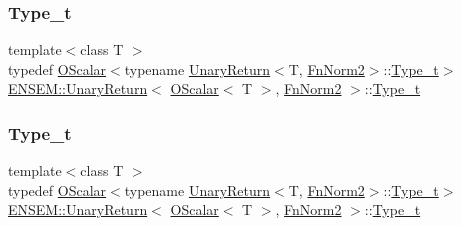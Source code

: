 \subsubsection{\texorpdfstring{Type\_t}{Type\_t}\hspace{0.1cm}{\footnotesize\ttfamily [1/3]}}
{\footnotesize\ttfamily template$<$class T $>$ \\
typedef \mbox{\hyperlink{classENSEM_1_1OScalar}{O\+Scalar}}$<$typename \mbox{\hyperlink{structENSEM_1_1UnaryReturn}{Unary\+Return}}$<$T, \mbox{\hyperlink{structENSEM_1_1FnNorm2}{Fn\+Norm2}}$>$\+::\mbox{\hyperlink{structENSEM_1_1UnaryReturn_3_01OScalar_3_01T_01_4_00_01FnNorm2_01_4_ac5e99e6905d2033009638fb21f07f1be}{Type\+\_\+t}}$>$ \mbox{\hyperlink{structENSEM_1_1UnaryReturn}{E\+N\+S\+E\+M\+::\+Unary\+Return}}$<$ \mbox{\hyperlink{classENSEM_1_1OScalar}{O\+Scalar}}$<$ T $>$, \mbox{\hyperlink{structENSEM_1_1FnNorm2}{Fn\+Norm2}} $>$\+::\mbox{\hyperlink{structENSEM_1_1UnaryReturn_3_01OScalar_3_01T_01_4_00_01FnNorm2_01_4_ac5e99e6905d2033009638fb21f07f1be}{Type\+\_\+t}}}

\mbox{\label{structENSEM_1_1UnaryReturn_3_01OScalar_3_01T_01_4_00_01FnNorm2_01_4_ac5e99e6905d2033009638fb21f07f1be}} 
\subsubsection{\texorpdfstring{Type\_t}{Type\_t}\hspace{0.1cm}{\footnotesize\ttfamily [2/3]}}
{\footnotesize\ttfamily template$<$class T $>$ \\
typedef \mbox{\hyperlink{classENSEM_1_1OScalar}{O\+Scalar}}$<$typename \mbox{\hyperlink{structENSEM_1_1UnaryReturn}{Unary\+Return}}$<$T, \mbox{\hyperlink{structENSEM_1_1FnNorm2}{Fn\+Norm2}}$>$\+::\mbox{\hyperlink{structENSEM_1_1UnaryReturn_3_01OScalar_3_01T_01_4_00_01FnNorm2_01_4_ac5e99e6905d2033009638fb21f07f1be}{Type\+\_\+t}}$>$ \mbox{\hyperlink{structENSEM_1_1UnaryReturn}{E\+N\+S\+E\+M\+::\+Unary\+Return}}$<$ \mbox{\hyperlink{classENSEM_1_1OScalar}{O\+Scalar}}$<$ T $>$, \mbox{\hyperlink{structENSEM_1_1FnNorm2}{Fn\+Norm2}} $>$\+::\mbox{\hyperlink{structENSEM_1_1UnaryReturn_3_01OScalar_3_01T_01_4_00_01FnNorm2_01_4_ac5e99e6905d2033009638fb21f07f1be}{Type\+\_\+t}}}


